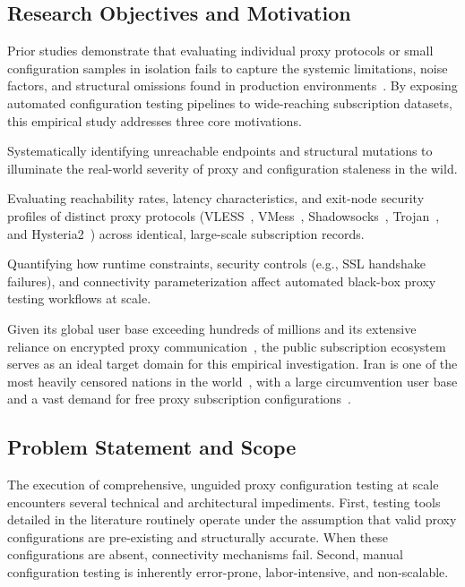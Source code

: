 \documentclass[10pt,conference]{IEEEtran}
\begin{document}
\subsection{Research Objectives and Motivation}
Prior studies demonstrate that evaluating individual proxy protocols or small configuration samples in isolation fails to capture the systemic limitations, noise factors, and structural omissions found in production environments~\cite{khanvpn2018,perino2019,proxytorrent2018,proxies_unmasked}.
By exposing automated configuration testing pipelines to wide-reaching subscription datasets, this empirical study addresses three core motivations.
\begin{sloppypar}
\begin{LaTeXdescription}
    \item[Configuration Scarcity] Systematically identifying unreachable endpoints and structural mutations to illuminate the real-world severity of proxy and configuration staleness in the wild.
    \item[Benchmarking] Evaluating reachability rates, latency characteristics, and exit-node security profiles of distinct proxy protocols (VLESS~\cite{xray_core}, VMess~\cite{v2ray}, Shadowsocks~\cite{shadowsocks}, Trojan~\cite{trojan_gfw}, and Hysteria2~\cite{hysteria2_proto}) across identical, large-scale subscription records.
    \item[Bottlenecks] Quantifying how runtime constraints, security controls (e.g., SSL handshake failures), and connectivity parameterization affect automated black-box proxy testing workflows at scale.
\end{LaTeXdescription}
\end{sloppypar}

Given its global user base exceeding hundreds of millions and its extensive reliance on encrypted proxy communication~\cite{irblock2025,aryan2013iran}, the public subscription ecosystem serves as an ideal target domain for this empirical investigation.
Iran is one of the most heavily censored nations in the world~\cite{aryan2013iran}, with a large circumvention user base and a vast demand for free proxy subscription configurations~\cite{irblock2025,aryapour2025}.

\subsection{Problem Statement and Scope}
The execution of comprehensive, unguided proxy configuration testing at scale encounters several technical and architectural impediments.
First, testing tools detailed in the literature routinely operate under the assumption that valid proxy configurations are pre-existing and structurally accurate.
When these configurations are absent, connectivity mechanisms fail.
Second, manual configuration testing is inherently error-prone, labor-intensive, and non-scalable.
\end{document}
